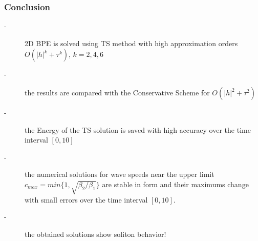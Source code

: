 \documentclass{beamer}
\begin{document}

\begin{frame}
\frametitle{Conclusion}

\begin{description}
 \item[-] 2D BPE is solved using TS method with high approximation orders $O(|h|^k+\tau^k)$, $k=2,4,6$
 \item[-] the results are compared with the Conservative Scheme for $O(|h|^2+\tau^2)$
 \item[-] the Energy of the TS solution is saved with high accuracy over the time interval $[0, 10]$
 \item[-] the numerical solutions for wave speeds near the upper limit $c_{max} = min\{1, \sqrt{\beta_2/\beta_1} \}$ are stable in form and their maximums change with small errors over the time interval $[0, 10]$.
\item[-] the obtained solutions show soliton behavior!
\end{description}

\end{frame}

\end{document}
